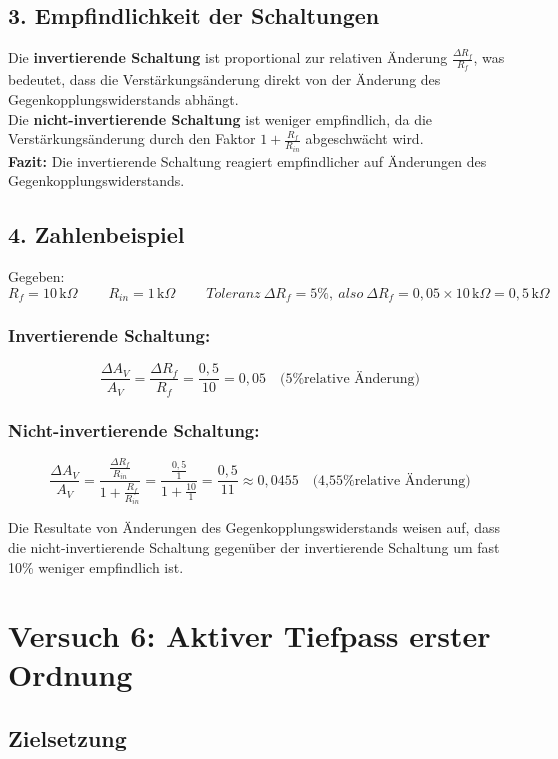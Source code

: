 \documentclass[a4paper,12pt]{article}
\begin{document}
\subsection*{3. Empfindlichkeit der Schaltungen}
Die \textbf{invertierende Schaltung} ist proportional zur relativen Änderung \( \frac{\Delta R_f}{R_f} \), was bedeutet, dass die Verstärkungsänderung direkt von der Änderung des Gegenkopplungswiderstands abhängt.\\
\noindent Die \textbf{nicht-invertierende Schaltung} ist weniger empfindlich, da die Verstärkungsänderung durch den Faktor \( 1 + \frac{R_f}{R_{in}} \) abgeschwächt wird.\\
\noindent \textbf{Fazit:} Die invertierende Schaltung reagiert empfindlicher auf Änderungen des Gegenkopplungswiderstands.

\subsection*{4. Zahlenbeispiel}
Gegeben:
\[
 R_f = 10 \, \text{k}\Omega~~~~~~~~~~R_{in} = 1 \, \text{k}\Omega~~~~~~~~~~Toleranz~\Delta R_f = 5\%,~ also~\Delta R_f = 0,05 \times 10 \, \text{k}\Omega = 0,5 \, \text{k}\Omega
\]


\subsubsection*{Invertierende Schaltung:}
\[
\frac{\Delta A_V}{A_V} = \frac{\Delta R_f}{R_f} = \frac{0,5}{10} = 0,05 \quad \text{(5\% relative Änderung)}
\]

\subsubsection*{Nicht-invertierende Schaltung:}
\[
\frac{\Delta A_V}{A_V} = \frac{\frac{\Delta R_f}{R_{in}}}{1 + \frac{R_f}{R_{in}}} = \frac{\frac{0,5}{1}}{1 + \frac{10}{1}} = \frac{0,5}{11} \approx 0,0455 \quad \text{(4,55\% relative Änderung)}
\]

\noindent Die Resultate von Änderungen des Gegenkopplungswiderstands weisen auf, dass die nicht-invertierende Schaltung gegenüber der invertierende Schaltung um fast 10\% weniger empfindlich ist. 



\newpage
\section{Versuch 6: Aktiver Tiefpass erster Ordnung}
\subsection{Zielsetzung}
\end{document}
